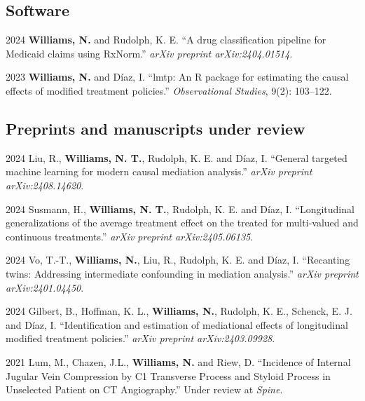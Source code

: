 \documentclass[12pt,letterpaper]{report}
\begin{document}
    \subsection*{Software}
    
    \begin{tablist}
    
    \item[2024] \tab \textbf{Williams, N.} and Rudolph, K. E. \enquote{A drug classification pipeline for Medicaid claims using RxNorm.} \textit{arXiv preprint arXiv:2404.01514}.
    
    \item[2023] \tab \textbf{Williams, N.} and Díaz, I. \enquote{lmtp: An R package for estimating the causal effects of modified treatment policies.} \textit{Observational Studies}, 9(2): 103--122.
    
    \end{tablist}
    
    \subsection*{Preprints and manuscripts under review}
    
    \begin{tablist}
    
    \item[2024] \tab Liu, R., \textbf{Williams, N. T.}, Rudolph, K. E. and Díaz, I. \enquote{General targeted machine learning for modern causal mediation analysis.} \textit{arXiv preprint arXiv:2408.14620}.
    
    \item[2024] \tab Susmann, H., \textbf{Williams, N. T.}, Rudolph, K. E. and Díaz, I. \enquote{Longitudinal generalizations of the average treatment effect on the treated for multi-valued and continuous treatments.} \textit{arXiv preprint arXiv:2405.06135}.
    
    \item[2024] \tab Vo, T.-T., \textbf{Williams, N.}, Liu, R., Rudolph, K. E. and Díaz, I. \enquote{Recanting twins: Addressing intermediate confounding in mediation analysis.} \textit{arXiv preprint arXiv:2401.04450}.
    
    \item[2024] \tab Gilbert, B., Hoffman, K. L., \textbf{Williams, N.}, Rudolph, K. E., Schenck, E. J. and Díaz, I. \enquote{Identification and estimation of mediational effects of longitudinal modified treatment policies.} \textit{arXiv preprint arXiv:2403.09928}.
    
    \item[2021] \tab Lum, M., Chazen, J.L., \textbf{Williams, N.} and Riew, D. \enquote {Incidence of Internal Jugular Vein Compression by C1 Transverse Process and Styloid Process in Unselected Patient on CT Angiography.} Under review at \textit {Spine}.

    
    \end{tablist}
    
\end{document}
